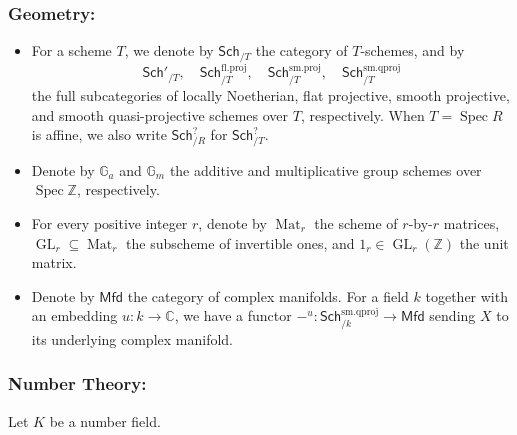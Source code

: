 \documentclass[12pt]{amsart}
\numberwithin{equation}{section}
\theoremstyle{plain}
\theoremstyle{definition}
\theoremstyle{remark}
\renewcommand{\d}[1]{\mathbb{#1}}
\renewcommand{\r}[1]{\mathrm{#1}}
\renewcommand{\sf}[1]{\mathsf{#1}}
\renewcommand{\(}{\left(}
\renewcommand{\)}{\right)}
\newcommand{\dC}{\d C}
\newcommand{\dG}{\d G}
\newcommand{\dZ}{\d Z}
\newcommand{\proj}{\r{fl.proj}}
\newcommand{\smp}{\r{sm.proj}}
\newcommand{\smq}{\r{sm.qproj}}
\newcommand{\Sch}{\sf{Sch}}
\newcommand{\Mfd}{\sf{Mfd}}
\DeclareMathOperator{\GL}{GL}
\DeclareMathOperator{\Mat}{Mat}
\DeclareMathOperator{\Spec}{Spec}
\begin{document}
\subsubsection*{Geometry:}

\begin{itemize}
  \item For a scheme $T$, we denote by $\Sch_{/T}$ the category of $T$-schemes, and by
      \[
      \Sch'_{/T},\quad \Sch^\proj_{/T},\quad \Sch^\smp_{/T},\quad  \Sch^\smq_{/T}
      \]
      the full subcategories of locally Noetherian, flat projective, smooth projective, and smooth quasi-projective schemes over $T$, respectively. When $T=\Spec R$ is affine, we also write $\Sch^?_{/R}$ for $\Sch^?_{/T}$.

  \item Denote by $\dG_a$ and $\dG_m$ the additive and multiplicative group schemes over $\Spec\dZ$, respectively.

  \item For every positive integer $r$, denote by $\Mat_r$ the scheme of $r$-by-$r$ matrices, $\GL_r\subseteq\Mat_r$ the subscheme of invertible ones, and $1_r\in\GL_r(\dZ)$ the unit matrix.

  \item Denote by $\Mfd$ the category of complex manifolds. For a field $k$ together with an embedding $u\colon k\to \dC$, we have a functor $-^u\colon\Sch^\smq_{/k}\to\Mfd$ sending $X$ to its underlying complex manifold.
\end{itemize}










\subsubsection*{Number Theory:}

Let $K$ be a number field.
\end{document}
